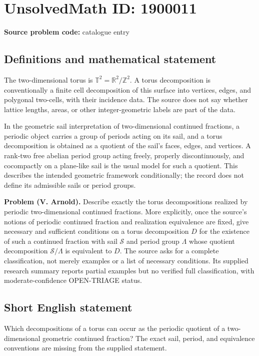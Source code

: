\documentclass[11pt]{article}
\begin{document}
\section*{UnsolvedMath ID: 1900011}
\textbf{Source problem code:} catalogue entry
\subsection{Definitions and mathematical statement}
The two-dimensional torus is $\mathbb T^2=\mathbb R^2/\mathbb Z^2$. A torus decomposition is conventionally a finite cell decomposition of this surface into vertices, edges, and polygonal two-cells, with their incidence data. The source does not say whether lattice lengths, areas, or other integer-geometric labels are part of the data.

In the geometric sail interpretation of two-dimensional continued fractions, a periodic object carries a group of periods acting on its sail, and a torus decomposition is obtained as a quotient of the sail's faces, edges, and vertices. A rank-two free abelian period group acting freely, properly discontinuously, and cocompactly on a plane-like sail is the usual model for such a quotient. This describes the intended geometric framework conditionally; the record does not define its admissible sails or period groups.

\textbf{Problem (V. Arnold).} Describe exactly the torus decompositions realized by periodic two-dimensional continued fractions. More explicitly, once the source's notions of periodic continued fraction and realization equivalence are fixed, give necessary and sufficient conditions on a torus decomposition $D$ for the existence of such a continued fraction with sail $\mathcal S$ and period group $\Lambda$ whose quotient decomposition $\mathcal S/\Lambda$ is equivalent to $D$. The source asks for a complete classification, not merely examples or a list of necessary conditions. Its supplied research summary reports partial examples but no verified full classification, with moderate-confidence OPEN-TRIAGE status.
\subsection{Short English statement}
Which decompositions of a torus can occur as the periodic quotient of a two-dimensional geometric continued fraction? The exact sail, period, and equivalence conventions are missing from the supplied statement.
\end{document}
